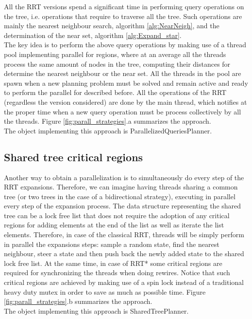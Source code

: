 All the RRT versions spend a significant time in performing query operations on the tree, i.e. operations that require to traverse all the tree.
Such operations are mainly the nearest neighbour search, algorithm \ref{alg:NearNeigh}, and the determination of the near set, algorithm \ref{alg:Expand_star}.
\\
The key idea is to perform the above query operations by making use of a thread pool implementing parallel for regions, where at an average all the threads process the same amount of nodes in the tree, computing their distances for determine the nearest neighbour or the near set. 
All the threads in the pool are spawn when a new planning problem must be solved and remain active and ready to perform the parallel for described before.
All the operations of the RRT (regardless the version considered) are done by the main thread, which notifies at the proper time when a new query operation must be process collectively by all the threads. Figure \ref{fig:parall_strategies}.a summarizes the approach.
\\
The object implementing this approach is ParallelizedQueriesPlanner.

\subsection{Shared tree critical regions}
\label{sec:strtg_shared}

Another way to obtain a parallelization is to simultaneously do every step of the RRT expansions. Therefore, we can imagine having threads sharing a common tree (or two trees in the case of a bidirectional strategy), executing in parallel every step of the expansion process. 
The data structure representing the shared tree can be a lock free list that does not require the adoption of any critical regions for adding elements at the end of the list as well as iterate the list elements.
Therefore, in case of the classical RRT, threads will be simply perform in parallel the expansions steps: sample a random state, find the nearest neighbour, steer a state and then push back the newly added state to the shared lock free list.
At the same time, in case of RRT* some critical regions are required for synchronizing the threads when doing rewires. Notice that such critical regions are achieved by making use of a spin lock instead of a traditional heavy duty mutex in order to save as much as possible time.
Figure \ref{fig:parall_strategies}.b summarizes the approach.
\\
The object implementing this approach is SharedTreePlanner.

